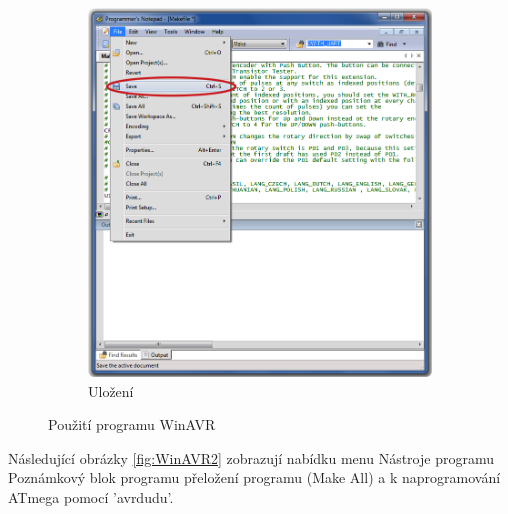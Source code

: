 \begin{figure}[H]
\begin{subfigure}[b]{.5\textwidth}
    \includegraphics[width=.85\textwidth]{../PNG/Notepad_save.png}
    \caption{Uložení }
  \end{subfigure}
  \caption{Použití programu WinAVR}
  \label{fig:WinAVR1}
\end{figure}

Následující obrázky \ref{fig:WinAVR2} zobrazují nabídku menu Nástroje programu Poznámkový blok
programu přeložení programu (Make All) a k naprogramování ATmega pomocí 'avrdudu'.

